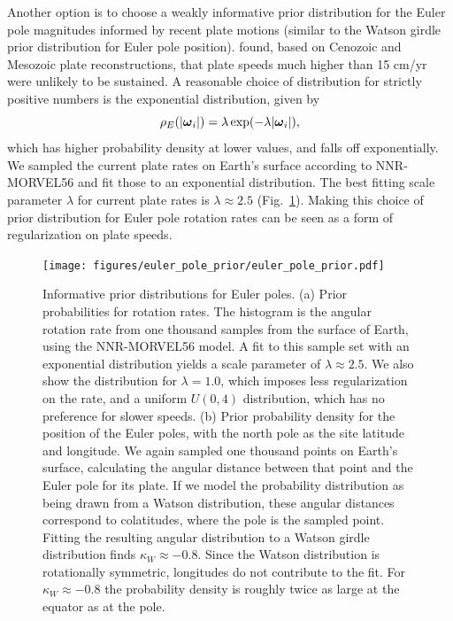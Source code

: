 \documentclass[11pt,letterpaper]{article}
\newcommand{\mitbf}[1]{\hbox{\mathversion{bold}$#1$}}
\begin{document}
Another option is to choose a weakly informative prior distribution for the Euler pole magnitudes informed by recent plate motions (similar to the Watson girdle prior distribution for Euler pole position). \citet{Zahirovic2015a} found, based on Cenozoic and Mesozoic plate reconstructions,
that plate speeds much higher than 15 cm/yr were unlikely to be sustained. A reasonable choice of distribution for strictly positive numbers is the exponential distribution, given by
\begin{equation}
\rho_E(\vert \mitbf{\omega}_i \vert) = \lambda \exp(-\lambda \vert \mitbf{\omega}_i \vert),
\end{equation}
which has higher probability density at lower values, and falls off exponentially. We sampled the current plate rates on Earth's surface according to NNR-MORVEL56
and fit those to an exponential distribution. The best fitting scale parameter $\lambda$ for current plate rates is $\lambda\approx2.5$ (Fig.~\ref{fig:euler_pole_prior}). Making this choice of prior distribution for Euler pole rotation rates can be seen as a form of regularization on plate speeds.

\begin{figure}
\texttt{[image: figures/euler\_pole\_prior/euler\_pole\_prior.pdf]}
\caption[Informative prior distributions for Euler poles]{Informative prior distributions for Euler poles. (a) Prior probabilities for rotation rates. The histogram is the angular rotation rate from one thousand samples from the surface of Earth, using the NNR-MORVEL56 model. A fit to this sample set with an exponential distribution yields a scale parameter of $\lambda \approx 2.5$. We also show the distribution for $\lambda = 1.0$, which imposes less regularization on the rate, and a uniform $U(0,4)$ distribution, which has no preference for slower speeds.
(b) Prior probability density for the position of the Euler poles, with the north pole as the site latitude and longitude. 
We again sampled one thousand points on Earth's surface, calculating the angular distance between that point and the Euler pole for its plate. 
If we model the probability distribution as being drawn from a Watson distribution, these angular distances correspond to colatitudes, where the pole is the sampled point. 
Fitting the resulting angular distribution to a Watson girdle distribution finds $\kappa_W \approx -0.8$. 
Since the Watson distribution is rotationally symmetric, longitudes do not contribute to the fit. 
For $\kappa_W \approx -0.8$ the probability density is roughly twice as large at the equator as at the pole.}
\label{fig:euler_pole_prior}
\end{figure}
\end{document}
